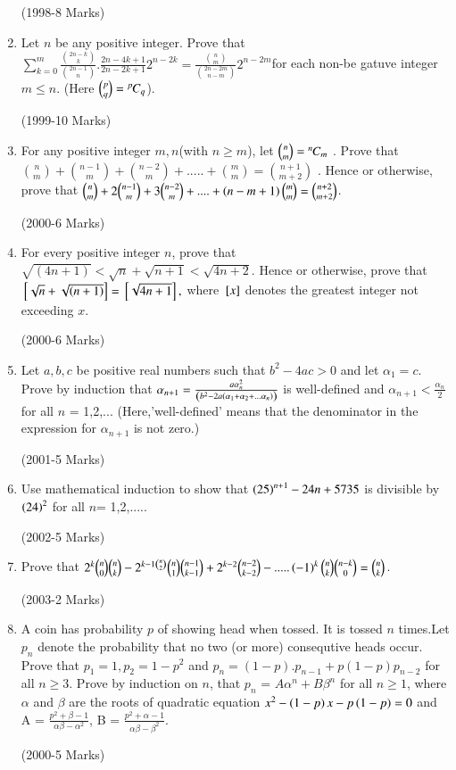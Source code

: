 \documentclass[journal,12pt,twocolumn]{IEEEtran}
\theoremstyle{remark}
\begin{document}
\begin{enumerate}[start=16]
		\hfill(1998-8 Marks)
\item 
	Let $n$ be any positive integer. Prove that $\sum\limits^{m}_{k=0}\frac{\binom{2n-k}{k}}{\binom{2n-1}{n}}.\frac{2n-4k+1}{2n-2k+1}2^{n-2k}= \frac{\binom{n}{m}}{\binom{2n-2m}{n-m}} 2^{n-2m}$for each non-be gatuve integer $m\leq n$. (Here $\binom{p}{q} = {{}^{p}\mkern-1muC_{q}}$).

		\hfill(1999-10 Marks)
\item
	For any positive integer $m,n$(with $n \geq m$), let $\binom{n}{m} ={{}^{n}\mkern-1muC_{m}}$ . Prove that $\binom{n}{m} + \binom{n-1}{m} + \binom{n-2}{m} + ..... + \binom{m}{m} = \binom{n+1}{m+2}$ . Hence or otherwise, prove that $\binom{n}{m} +2\binom{n-1}{m} +3\binom{n-2}{m}+....+ \left(n-m+1\right) \binom{m}{m} = \binom{n+2}{m+2}$.

		\hfill(2000-6 Marks)
\item
	For every positive integer $n$, prove that $\sqrt{(4n+1)} < \sqrt{n} +\sqrt{n+1} < \sqrt{4n+2}$. Hence or otherwise, prove that ${}\left[\sqrt{n} + \sqrt{\left(n+1\right)}\right]= {}\left[\sqrt{4n+1}\right],$ where ${}\left[x\right]$ denotes the greatest integer not exceeding $x$.

		\hfill(2000-6 Marks)
\item
Let $a,b,c$ be positive real numbers such that $b^2 - 4ac > 0$ and let $\alpha_1 = c$. Prove by induction that $\alpha_{n+1} = \frac{a\alpha_{n}^2}{\left(b^2 - 2a \left(\alpha_1 + \alpha_2 + ... \alpha_n\right)\right)}$ is well-defined and $\alpha_{n+1} < \frac{\alpha_n}{2}$ for all $n$ = 1,2,...
		(Here,'well-defined' means that the denominator in the expression for $\alpha_{n+1}$ is not zero.)

		\hfill(2001-5 Marks)
\item
Use mathematical induction to show that $\left(25\right)^{n+1} - 24 n + 5735$ is divisible by $\left(24\right)^2$ for all $n$= 1,2,.....

		\hfill(2002-5 Marks)
\item 
Prove that $2^k \binom{n}{0}\binom{n}{k} - 2^{k-1\binom{n}{2}} \binom{n}{1} \binom{n-1}{k-1} + 2^{k-2}\binom{n-2}{k-2} - .....\left(-1\right)^k \binom{n}{k}\binom{n-k}{0} = \binom{n}{k}$.

		\hfill(2003-2 Marks)
\item
A coin has probability $p$ of showing head when tossed. It is tossed $n$ times.Let $p_n$ denote the probability that no two (or more) consequtive heads occur. Prove that $p_1=1 , p_2=1-p^2$ and $p_n = (1-p).p_{n-1} + p(1-p)p_{n-2}$ for all $ n \geq 3 $. Prove by induction on $n$, that $p_n$ = $A\alpha^n + B\beta^n$ for all $n \geq 1$, where $\alpha$ and $\beta$ are the roots of quadratic equation $x^2 - \left(1-p\right)x - p\left(1-p\right) = 0$ and A = $\frac{p^2 + \beta -1}{\alpha\beta-\alpha^2}$, B = $\frac{p^2 + \alpha -1}{\alpha\beta - \beta^2}$.

		\hfill(2000-5 Marks)



\end{enumerate}
\end{document}
